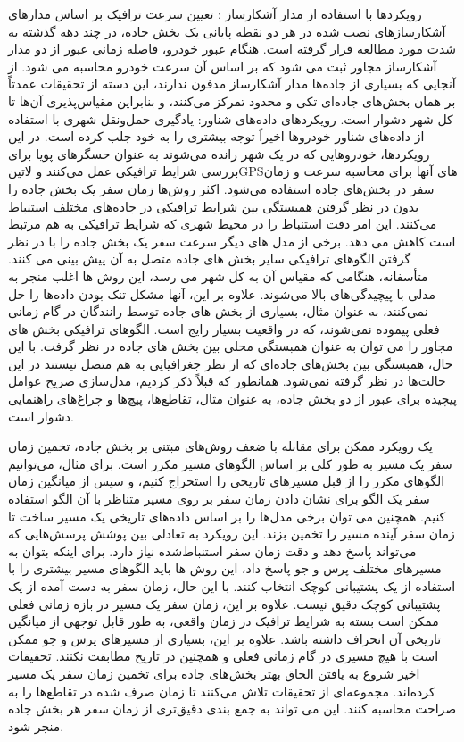 رویکردها با استفاده از مدار آشکارساز : تعیین سرعت ترافیک بر اساس مدارهای آشکارسازهای نصب شده در هر دو نقطه پایانی یک بخش جاده، در چند دهه گذشته به شدت مورد مطالعه قرار گرفته است. هنگام عبور خودرو، فاصله زمانی عبور از دو مدار آشکارساز مجاور ثبت می شود که بر اساس آن سرعت خودرو محاسبه می شود. از آنجایی که بسیاری از جاده‌ها مدار آشکارساز مدفون ندارند، این دسته از تحقیقات عمدتاً بر همان بخش‌های جاده‌ای تکی و محدود تمرکز می‌کنند، و بنابراین مقیاس‌پذیری آن‌ها تا کل شهر دشوار است.
رویکردهای داده‌های شناور: یادگیری حمل‌ونقل شهری با استفاده از داده‌های شناور خودروها اخیراً توجه بیشتری را به خود جلب کرده است. در این رویکردها، خودروهایی که در یک شهر رانده می‌شوند به عنوان حسگرهای پویا برای بررسی شرایط ترافیکی عمل می‌کنند و ‌لاتین{GPS}های آنها برای محاسبه سرعت و زمان سفر در بخش‌های جاده استفاده می‌شود. اکثر روش‌ها زمان سفر یک بخش جاده را بدون در نظر گرفتن همبستگی بین شرایط ترافیکی در جاده‌های مختلف استنباط می‌کنند. این امر دقت استنباط را در محیط شهری که شرایط ترافیکی به هم مرتبط است کاهش می دهد. برخی از مدل های دیگر سرعت سفر یک بخش جاده را با در نظر گرفتن الگوهای ترافیکی سایر بخش های جاده متصل به آن پیش بینی می کنند. متأسفانه، هنگامی که مقیاس آن به کل شهر می رسد، این روش ها اغلب منجر به مدلی با پیچیدگی‌های بالا می‌شوند. علاوه بر این، آنها مشکل تنک بودن داده‌ها را حل نمی‌کنند، به عنوان مثال، بسیاری از بخش های جاده توسط رانندگان در گام زمانی فعلی پیموده نمی‌شوند، که در واقعیت بسیار رایج است. الگوهای ترافیکی بخش های مجاور را می توان به عنوان همبستگی محلی بین بخش های جاده در نظر گرفت. با این حال، همبستگی بین بخش‌های جاده‌ای که از نظر جغرافیایی به هم متصل نیستند در این حالت‌ها در نظر گرفته نمی‌شود. همانطور که قبلاً ذکر کردیم، مدل‌سازی صریح عوامل پیچیده برای عبور از دو بخش جاده، به عنوان مثال، تقاطع‌ها، پیچ‌ها و چراغ‌های راهنمایی دشوار است.

یک رویکرد ممکن برای مقابله با ضعف روش‌های مبتنی بر بخش جاده، تخمین زمان سفر یک مسیر به طور کلی بر اساس الگوهای مسیر مکرر است. برای مثال، می‌توانیم الگوهای مکرر را از قبل مسیرهای تاریخی را استخراج کنیم، و سپس از میانگین زمان سفر یک الگو برای نشان دادن زمان سفر بر روی مسیر متناظر با آن الگو استفاده کنیم. همچنین می توان برخی مدل‌ها را بر اساس داده‌های تاریخی یک مسیر ساخت تا زمان سفر آینده مسیر را تخمین بزند. این رویکرد به تعادلی بین پوشش پرسش‌هایی که می‌تواند پاسخ دهد و دقت زمان سفر استنباط‌شده نیاز دارد. برای اینکه بتوان به مسیرهای مختلف پرس و جو پاسخ داد، این روش ها باید الگوهای مسیر بیشتری را با استفاده از یک پشتیبانی کوچک انتخاب کنند. با این حال، زمان سفر به دست آمده از یک پشتیبانی کوچک دقیق نیست. علاوه بر این، زمان سفر یک مسیر در بازه زمانی فعلی ممکن است بسته به شرایط ترافیک در زمان واقعی، به طور قابل توجهی از میانگین تاریخی آن انحراف داشته باشد. علاوه بر این، بسیاری از مسیرهای پرس و جو ممکن است با هیچ مسیری در گام زمانی فعلی و همچنین در تاریخ مطابقت نکنند. تحقیقات اخیر شروع به یافتن الحاق بهتر بخش‌های جاده برای تخمین زمان سفر یک مسیر کرده‌اند. مجموعه‌ای از تحقیقات تلاش می‌کنند تا زمان صرف شده در تقاطع‌ها را به صراحت محاسبه کنند. این می تواند به جمع بندی دقیق‌تری از زمان سفر هر بخش جاده منجر شود.

